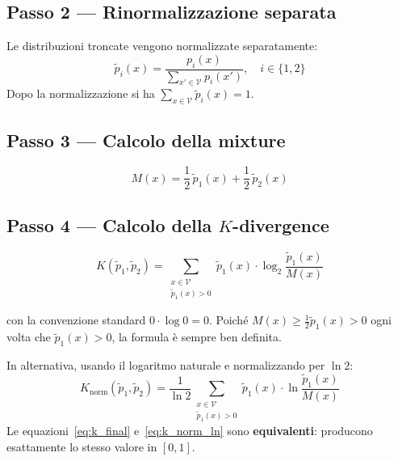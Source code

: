 \documentclass[12pt, a4paper]{article}
\begin{document}
\subsection*{Passo 2 — Rinormalizzazione separata}

Le distribuzioni troncate vengono normalizzate separatamente:
\begin{equation}
    \tilde{p}_i(x) = \frac{p_i(x)}{\displaystyle\sum_{x' \in \mathcal{V}} p_i(x')}, \quad i \in \{1, 2\}
    \label{eq:normalization}
\end{equation}
Dopo la normalizzazione si ha \(\sum_{x \in \mathcal{V}} \tilde{p}_i(x) = 1\).

\subsection*{Passo 3 — Calcolo della mixture}

\begin{equation}
    M(x) = \frac{1}{2}\,\tilde{p}_1(x) + \frac{1}{2}\,\tilde{p}_2(x)
    \label{eq:mixture}
\end{equation}

\subsection*{Passo 4 — Calcolo della \(K\)-divergence}

\begin{equation}
    K(\tilde{p}_1, \tilde{p}_2) = \sum_{\substack{x \in \mathcal{V} \\ \tilde{p}_1(x) > 0}} \tilde{p}_1(x) \cdot \log_2 \frac{\tilde{p}_1(x)}{M(x)}
    \label{eq:k_final}
\end{equation}

con la convenzione standard \(0 \cdot \log 0 = 0\). Poiché \(M(x) \geq \frac{1}{2}\tilde{p}_1(x) > 0\) ogni volta che \(\tilde{p}_1(x) > 0\), la formula è sempre ben definita.

In alternativa, usando il logaritmo naturale e normalizzando per \(\ln 2\):
\begin{equation}
    K_{\mathrm{norm}}(\tilde{p}_1, \tilde{p}_2) = \frac{1}{\ln 2}\sum_{\substack{x \in \mathcal{V} \\ \tilde{p}_1(x) > 0}} \tilde{p}_1(x) \cdot \ln \frac{\tilde{p}_1(x)}{M(x)}
    \label{eq:k_norm_ln}
\end{equation}
Le equazioni~\eqref{eq:k_final} e~\eqref{eq:k_norm_ln} sono \textbf{equivalenti}: producono esattamente lo stesso valore in \([0,1]\).
\end{document}

